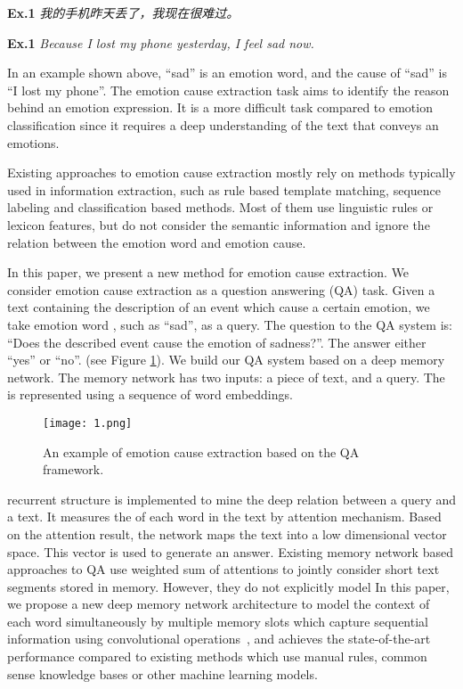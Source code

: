 \documentclass[11pt,letterpaper]{article}
\begin{document}
\begin{CJK*}{UTF8}{gbsn}
\noindent \textbf{Ex.1} \emph{我的手机昨天丢了，我现在很难过。}

\noindent \textbf{Ex.1} \emph{Because I lost my phone yesterday, I feel sad now.}

In an example shown above, ``sad'' is an emotion word, and the cause of ``sad'' is ``I lost my phone''. The emotion cause extraction task aims to identify the reason behind an emotion expression. It is a more difficult task compared to emotion classification since it requires a deep understanding of the text that conveys an emotions.

Existing approaches to emotion cause extraction mostly rely on methods typically used in information extraction, such as rule based template matching, sequence labeling and classification based methods. Most of them use linguistic rules or lexicon features, but do not consider the semantic information and ignore the relation between the emotion word and emotion cause. 

In this paper, we present a new method for emotion cause extraction. We consider 
emotion cause extraction as a question  answering (QA) task. Given a text containing the description of an event which  cause
a certain emotion, we take 
emotion word , such as ``sad'', as a query. The question to the QA system is: ``Does the described event cause the emotion of sadness?''. The  answer 
either ``yes'' or ``no''. (see Figure \ref{fig:figure1}). We build our QA system based on a deep memory network. The memory network has two inputs: a piece of text,  and a query. The 
is represented using a sequence of word embeddings. 

\begin{figure}[htbp]
\label{fig:figure1}
\centering
\texttt{[image: 1.png]}
\caption{An example of emotion cause extraction based on the QA framework.}
\end{figure}

 recurrent structure is implemented to mine the deep relation between a query and a text. It measure\added[id=lq]{}s the 
of each word in the text by  attention mechanism. Based on the  attention result, 
the network maps the text into a low dimensional vector space. 
This vector is  used to generate an answer. Existing memory network based approaches to QA use weighted sum of attentions to jointly consider short text segments stored in memory. However, they do not explicitly model 
In this paper, we propose a new deep memory network architecture to model the context of each word simultaneously by
multiple memory slots which capture sequential information using convolutional operations~\cite{kim2014con}, and 
achieves the state-of-the-art performance compared to existing methods which use manual rules, common sense knowledge bases or other machine learning models.




\end{CJK*}
\end{document}
